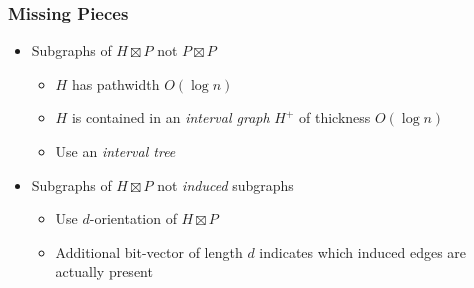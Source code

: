 \documentclass[aspectratio=169,xcolor=dvipsnames]{beamer}
\begin{document}
\begin{frame}
    \frametitle{Missing Pieces}

    \begin{itemize}[<+->]
        \item Subgraphs of $H\boxtimes P$ not $P\boxtimes P$
        \begin{itemize}
            \item $H$ has pathwidth $O(\log n)$
            \item $H$ is contained in an \emph{interval graph} $H^+$ of thickness $O(\log n)$
            \item Use an \emph{interval tree}
        \end{itemize}

        \item Subgraphs of $H\boxtimes P$ not \emph{induced} subgraphs
        \begin{itemize}
            \item Use $d$-orientation of $H\boxtimes P$
            \item Additional bit-vector of length $d$ indicates which induced edges are actually present
        \end{itemize}
    \end{itemize}


\end{frame}
\end{document}
